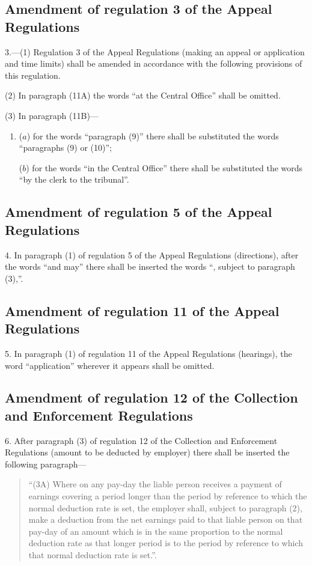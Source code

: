 \documentclass[12pt,a4paper]{article}
\begin{document}
\subsection[3. Amendment of regulation 3 of the Appeal Regulations]{Amendment of regulation 3 of the Appeal Regulations}

3.—(1) Regulation 3 of the Appeal Regulations (making an appeal or application and time limits) shall be amended in accordance with the following provisions of this regulation.

(2) In paragraph (11A) the words “at the Central Office” shall be omitted.

(3) In paragraph (11B)—
\begin{enumerate}\item[]
($a$) for the words “paragraph (9)” there shall be substituted the words “paragraphs (9) or (10)”;

($b$) for the words “in the Central Office” there shall be substituted the words “by the clerk to the tribunal”.
\end{enumerate}

\subsection[4. Amendment of regulation 5 of the Appeal Regulations]{Amendment of regulation 5 of the Appeal Regulations}

4.  In paragraph (1) of regulation 5 of the Appeal Regulations (directions), after the words “and may” there shall be inserted the words “, subject to paragraph (3),”.

\subsection[5. Amendment of regulation 11 of the Appeal Regulations]{Amendment of regulation 11 of the Appeal Regulations}

5.  In paragraph (1) of regulation 11 of the Appeal Regulations (hearings), the word “application” wherever it appears shall be omitted.

\subsection[6. Amendment of regulation 12 of the Collection and Enforcement Regulations]{Amendment of regulation 12 of the Collection and Enforcement Regulations}

6.  After paragraph (3) of regulation 12 of the Collection and Enforcement Regulations (amount to be deducted by employer) there shall be inserted the following paragraph—
\begin{quotation}
“(3A) Where on any pay-day the liable person receives a payment of earnings covering a period longer than the period by reference to which the normal deduction rate is set, the employer shall, subject to paragraph (2), make a deduction from the net earnings paid to that liable person on that pay-day of an amount which is in the same proportion to the normal deduction rate as that longer period is to the period by reference to which that normal deduction rate is set.”.
\end{quotation}
\end{document}
